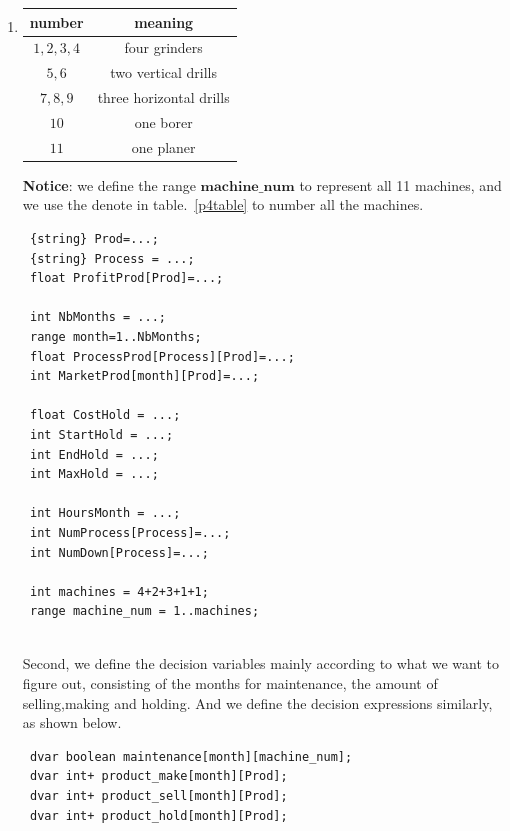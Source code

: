 \documentclass[12pt,a4paper]{article}
\makeatletter
\newtheorem*{solution}{Solution}
\theoremstyle{definition}
\renewenvironment{solution}[1][Solution] {\par\pushQED{\qed}\normalfont\topsep6\p@\@plus6\p@\relax\trivlist\item[\hskip\labelsep\bfseries#1\@addpunct{.}]\ignorespaces}{\popQED\endtrivlist\@endpefalse} \makeatother
\makeatother
\begin{document}
\begin{enumerate}
\begin{enumerate}
\begin{solution}
    
    \begin{center}

    \begin{tabular}{|c| c|}
    
    \hline
    number & meaning \\
    \hline
    \label{p4table}
       $1,2,3,4$ & four grinders\\
       $5,6$ & two vertical drills\\
       $7,8,9$ & three horizontal drills\\
       $10$ & one borer\\
       $11$ & one planer\\
       \hline
       
    \end{tabular}
            
    \end{center}
    
    \textbf{Notice}: we define the range $\mathbf{machine\_num}$ to represent all 11 machines, and we use the denote in table.~\ref{p4table} to number all the machines.
    
    \begin{lstlisting}
 {string} Prod=...;
 {string} Process = ...;
 float ProfitProd[Prod]=...;
 
 int NbMonths = ...;
 range month=1..NbMonths;
 float ProcessProd[Process][Prod]=...;
 int MarketProd[month][Prod]=...;
 
 float CostHold = ...;
 int StartHold = ...;
 int EndHold = ...;
 int MaxHold = ...;
 
 int HoursMonth = ...;
 int NumProcess[Process]=...;
 int NumDown[Process]=...;
 
 int machines = 4+2+3+1+1;
 range machine_num = 1..machines;
 
    \end{lstlisting}
    
Second, we define the decision variables mainly according to what we want to figure out, consisting of the months for maintenance, the amount of selling,making and holding. And we define the decision expressions similarly, as shown below.
\begin{lstlisting}
 dvar boolean maintenance[month][machine_num];
 dvar int+ product_make[month][Prod];
 dvar int+ product_sell[month][Prod];
 dvar int+ product_hold[month][Prod]; 
 

\end{lstlisting}
\end{solution}
\end{enumerate}
\end{enumerate}
\end{document}

